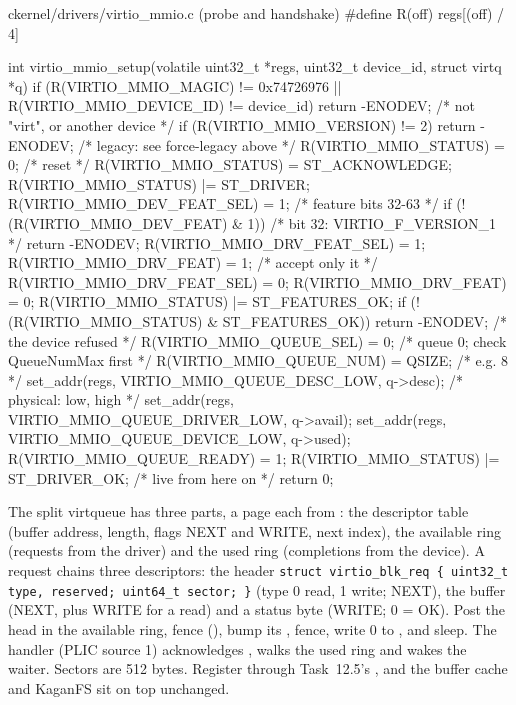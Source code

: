\documentclass[11pt,a4paper]{article}
\begin{document}
\begin{lst}{c}{kernel/drivers/virtio_mmio.c (probe and handshake)}
#define R(off) regs[(off) / 4]

int virtio_mmio_setup(volatile uint32_t *regs, uint32_t device_id, struct virtq *q)
{
    if (R(VIRTIO_MMIO_MAGIC) != 0x74726976 || R(VIRTIO_MMIO_DEVICE_ID) != device_id)
        return -ENODEV;                           /* not "virt", or another device */
    if (R(VIRTIO_MMIO_VERSION) != 2)
        return -ENODEV;                           /* legacy: see force-legacy above */
    R(VIRTIO_MMIO_STATUS) = 0;                    /* reset */
    R(VIRTIO_MMIO_STATUS) = ST_ACKNOWLEDGE;
    R(VIRTIO_MMIO_STATUS) |= ST_DRIVER;
    R(VIRTIO_MMIO_DEV_FEAT_SEL) = 1;              /* feature bits 32-63 */
    if (!(R(VIRTIO_MMIO_DEV_FEAT) & 1))           /* bit 32: VIRTIO_F_VERSION_1 */
        return -ENODEV;
    R(VIRTIO_MMIO_DRV_FEAT_SEL) = 1;  R(VIRTIO_MMIO_DRV_FEAT) = 1;   /* accept only it */
    R(VIRTIO_MMIO_DRV_FEAT_SEL) = 0;  R(VIRTIO_MMIO_DRV_FEAT) = 0;
    R(VIRTIO_MMIO_STATUS) |= ST_FEATURES_OK;
    if (!(R(VIRTIO_MMIO_STATUS) & ST_FEATURES_OK))
        return -ENODEV;                           /* the device refused */
    R(VIRTIO_MMIO_QUEUE_SEL) = 0;                 /* queue 0; check QueueNumMax first */
    R(VIRTIO_MMIO_QUEUE_NUM) = QSIZE;             /* e.g. 8 */
    set_addr(regs, VIRTIO_MMIO_QUEUE_DESC_LOW, q->desc);     /* physical: low, high */
    set_addr(regs, VIRTIO_MMIO_QUEUE_DRIVER_LOW, q->avail);
    set_addr(regs, VIRTIO_MMIO_QUEUE_DEVICE_LOW, q->used);
    R(VIRTIO_MMIO_QUEUE_READY) = 1;
    R(VIRTIO_MMIO_STATUS) |= ST_DRIVER_OK;        /* live from here on */
    return 0;
}
\end{lst}

The split virtqueue has three parts, a page each from : the descriptor table (buffer address,
length, flags NEXT and WRITE, next index), the available ring (requests from the driver) and the used ring (completions
from the device). A request chains three descriptors: the header \texttt{struct virtio\_blk\_req \{ uint32\_t type,
reserved; uint64\_t sector; \}} (type 0 read, 1 write; NEXT), the buffer (NEXT, plus WRITE for a read) and a status
byte (WRITE; 0 = OK). Post the head in the available ring, fence (), bump its ,
fence, write 0 to , and sleep. The handler (PLIC source 1) acknowledges , walks
the used ring and wakes the waiter. Sectors are 512 bytes. Register  through Task~12.5's
, and the buffer cache and KaganFS sit on top unchanged.
\end{document}
